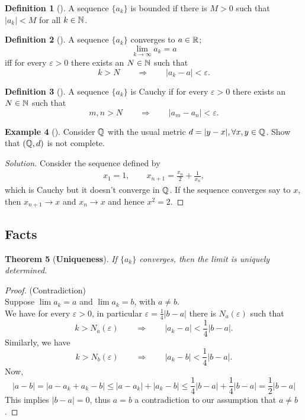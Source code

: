 \documentclass[	DIV=calc,paper=a4,fontsize=11pt]{scrartcl}	 	%
\newtheorem{thm}{Theorem}[section]
\theoremstyle{definition}
\newtheorem{defn}[thm]{Definition}
\newtheorem{exmp}[thm]{Example}
\theoremstyle{plain}
\theoremstyle{remark}
\begin{document}
\begin{defn}[\textbf{\color{blue}{Bounded}}]
A sequence $\{a_k\}$ is bounded if there is $M>0$ such that $|a_k|<M$ for all $k\in \Bbb N$.
\end{defn}

\begin{defn}[\textbf{\color{blue}{Convergent}}]
A sequence $\{a_k\}$ converges to $a\in \Bbb R$;
\[\lim_{k\rightarrow \infty} a_k=a\]
iff for every $\varepsilon>0$ there exists an $N\in \Bbb N$ such that
\[k>N \qquad \Rightarrow \qquad |a_k-a|<\varepsilon.\]
\end{defn}

\begin{defn}[\textbf{\color{blue}{Cauchy criterion}}]
A sequence $\{a_k\}$ is Cauchy if for every $\varepsilon>0$ there exists an $N\in \Bbb N$ such that
\[m,n>N \qquad \Rightarrow \qquad |a_m-a_n|<\varepsilon.\]
\end{defn}

\begin{exmp}[]
Consider $\Bbb Q$ with the usual metric $d=|y-x|,\forall x,y\in\Bbb Q$. Show that $(\Bbb Q,d)$ is not complete.
\end{exmp}
\begin{proof}[Solution]
Consider the sequence defined by
\begin{align} x_1=1,\qquad x_{n+1}=\frac{x_n}{2}+\frac{1}{x_n},
\end{align}
which is Cauchy but it doesn't converge in $\Bbb Q$. If the sequence converges say to $x$, then $x_{n+1}\to x$ and $x_n\to x$ and hence $x^2=2$.
\end{proof}
\subsection{Facts}

\begin{thm}[\textbf{Uniqueness}]
If $\{a_k\}$ converges, then the limit is uniquely determined.
\end{thm}

\begin{proof}(Contradiction)\\
Suppose $\lim a_k=a$ and $\lim a_k=b$, with $a\neq b$.\\
We have for every $\varepsilon>0$, in particular $\varepsilon=\frac{1}{4}|b-a|$ there is $N_{a}(\varepsilon)$ such that
\[k>N_{a}(\varepsilon) \qquad \Rightarrow \qquad |a_k-a|<\frac{1}{4}|b-a|.\]
Similarly, we have
\[k>N_{b}(\varepsilon) \qquad \Rightarrow \qquad |a_k-b|<\frac{1}{4}|b-a|.\]
Now,
\[|a-b|=|a-a_k+a_k-b|\leq |a-a_k|+|a_k-b|\leq \frac{1}{4}|b-a|+\frac{1}{4}|b-a|=\frac{1}{2}|b-a|\]
This implies $|b-a|=0$, thus $a=b$ a contradiction to our assumption that $a\neq b$.
\end{proof}
\end{document}
